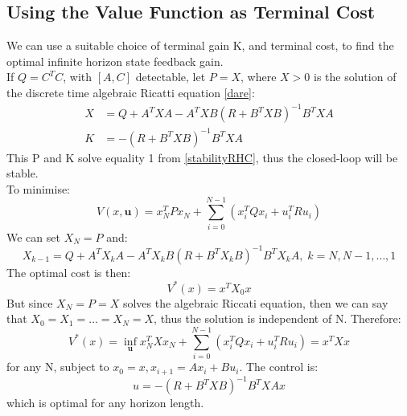 \documentclass{article}
\begin{document}
\subsection{Using the Value Function as Terminal Cost}
We can use a suitable choice of terminal gain K, and terminal cost, to find the optimal infinite horizon state feedback gain. \\
If $Q = C^TC$, with $[A,C]$ detectable, let $P = X$, where $X > 0$ is the solution of the discrete time algebraic Ricatti equation \eqref{dare}:
\[
\begin{aligned}
X &= Q+ A^TXA - A^TXB(R+B^TXB)^{-1}B^TXA \\
K &= -(R+B^TXB)^{-1}B^TXA
\end{aligned}
\]
This P and K solve equality 1 from \eqref{stabilityRHC}, thus the closed-loop will be stable. \\
To minimise:
\[
V(x,\textbf{u}) = x_N^TPx_N + \sum_{i=0}^{N-1}(x_i^TQx_i + u_i^TR u_i)
\]
We can set $X_N = P$ and:
\[
X_{k-1} = Q + A^TX_kA - A^TX_kB(R+B^TX_kB)^{-1}B^TX_kA, \; k=N,N-1,\hdots,1
\]
The optimal cost is then:
\[
V^*(x) = x^TX_0x
\]
But since $X_N=P=X$ solves the algebraic Riccati equation, then we can say that $X_0 = X_1 = ... = X_N = X$, thus the solution is independent of N. Therefore:
\[
V^*(x) = \inf_\textbf{u} x_N^TXx_N + \sum_{i=0}^{N-1} (x_i^TQx_i + u_i^TR u_i) = x^TXx
\]
for any N, subject to $x_0 = x, x_{i+1} = Ax_i + Bu_i$. The control is:
\[
u =  -(R + B^TXB)^{-1}B^TXAx
\]
which is optimal for any horizon length.
\end{document}
